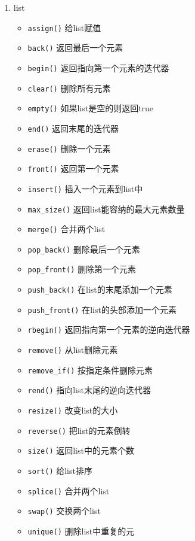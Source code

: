 \begin{enumerate}
	\item list
		\begin{itemize}
			\item \texttt{assign()} 给list赋值 
			\item \texttt{back()} 返回最后一个元素 
			\item \texttt{begin()} 返回指向第一个元素的迭代器 
			\item \texttt{clear()} 删除所有元素 
			\item \texttt{empty()} 如果list是空的则返回true 
			\item \texttt{end()} 返回末尾的迭代器
			\item \texttt{erase()} 删除一个元素
			\item \texttt{front()} 返回第一个元素
			\item \texttt{insert()} 插入一个元素到list中
			\item \texttt{max_size()} 返回list能容纳的最大元素数量
			\item \texttt{merge()} 合并两个list
			\item \texttt{pop_back()} 删除最后一个元素
			\item \texttt{pop_front()} 删除第一个元素
			\item \texttt{push_back()} 在list的末尾添加一个元素
			\item \texttt{push_front()} 在list的头部添加一个元素
			\item \texttt{rbegin()} 返回指向第一个元素的逆向迭代器
			\item \texttt{remove()} 从list删除元素
			\item \texttt{remove_if()} 按指定条件删除元素
			\item \texttt{rend()} 指向list末尾的逆向迭代器
			\item \texttt{resize()} 改变list的大小
			\item \texttt{reverse()} 把list的元素倒转
			\item \texttt{size()} 返回list中的元素个数
			\item \texttt{sort()} 给list排序
			\item \texttt{splice()} 合并两个list
			\item \texttt{swap()} 交换两个list
			\item \texttt{unique()} 删除list中重复的元
		\end{itemize}
\end{enumerate}
